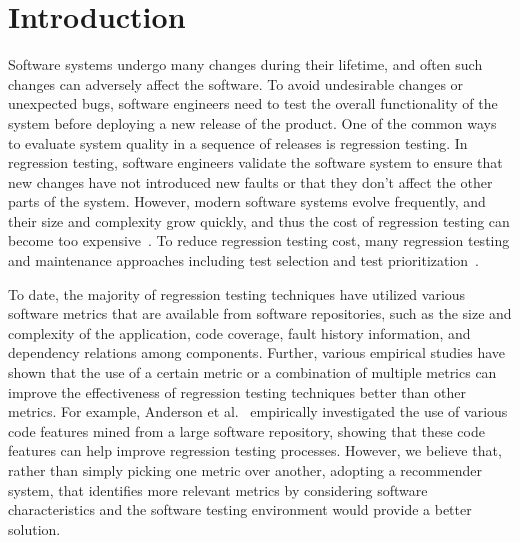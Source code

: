 \section{Introduction}
\label{sec:introduction}

Software systems undergo many changes during their lifetime, and often
such changes can adversely affect the software. 
To avoid undesirable changes or unexpected bugs, software engineers need to  
test the overall functionality of the system before deploying a new release 
of the product. One of the common ways to evaluate system quality 
in a sequence of releases is regression testing.
In regression testing, software engineers validate the software system
to ensure that new changes have not introduced new faults or that they don't 
affect the other parts of the system. However, modern software systems 
evolve frequently, and their size and complexity grow quickly, and thus  
the cost of regression testing can become too expensive~\cite{jeff16}. 
To reduce regression testing cost, many regression testing and maintenance
approaches including test selection and test prioritization~\cite{marksurvey}.

To date, the majority of regression testing techniques have utilized various 
software metrics that are available from software repositories, such as
the size and complexity of the application, code coverage, fault history information, 
and dependency relations among components. 
Further, various empirical studies have shown that the use of a certain metric or 
a combination of multiple metrics can improve the effectiveness of
regression testing techniques better than other metrics. For example, Anderson et 
al.~\cite{jeff14} empirically investigated the use of various code features
mined from a large software repository, showing that these code features
can help improve regression testing processes.
However, we believe that, rather than simply picking one metric over another, 
adopting a recommender system, that identifies more relevant metrics by considering 
software characteristics and the software testing environment would provide a better solution.


